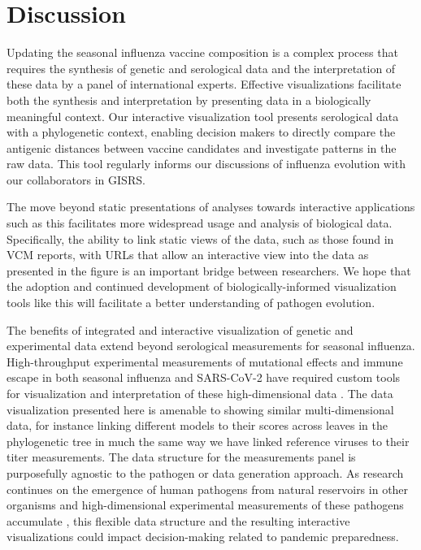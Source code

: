 \documentclass[utf8]{FrontiersinHarvard} %
\begin{document}
\section{Discussion}

Updating the seasonal influenza vaccine composition is a complex process that requires the synthesis of genetic and serological data and the interpretation of these data by a panel of international experts.
Effective visualizations facilitate both the synthesis and interpretation by presenting data in a biologically meaningful context.
Our interactive visualization tool presents serological data with a phylogenetic context, enabling decision makers to directly compare the antigenic distances between vaccine candidates and investigate patterns in the raw data.
This tool regularly informs our discussions of influenza evolution with our collaborators in GISRS.

The move beyond static presentations of analyses towards interactive applications such as this facilitates more widespread usage and analysis of biological data.
Specifically, the ability to link static views of the data, such as those found in VCM reports, with URLs that allow an interactive view into the data as presented in the figure is an important bridge between researchers.
We hope that the adoption and continued development of biologically-informed visualization tools like this will facilitate a better understanding of pathogen evolution.

The benefits of integrated and interactive visualization of genetic and experimental data extend beyond serological measurements for seasonal influenza.
High-throughput experimental measurements of mutational effects and immune escape in both seasonal influenza and SARS-CoV-2 have required custom tools for visualization and interpretation of these high-dimensional data \citep{Hilton2020,Aksamentov2021,Garrett2021,Greaney2022}.
The data visualization presented here is amenable to showing similar multi-dimensional data, for instance linking different models to their scores across leaves in the phylogenetic tree in much the same way we have linked reference viruses to their titer measurements.
The data structure for the measurements panel is purposefully agnostic to the pathogen or data generation approach.
As research continues on the emergence of human pathogens from natural reservoirs in other organisms \citep{Olival2017,Leendertz2016} and high-dimensional experimental measurements of these pathogens accumulate \citep{Soh2019,Starr2022}, this flexible data structure and the resulting interactive visualizations could impact decision-making related to pandemic preparedness.
\end{document}
